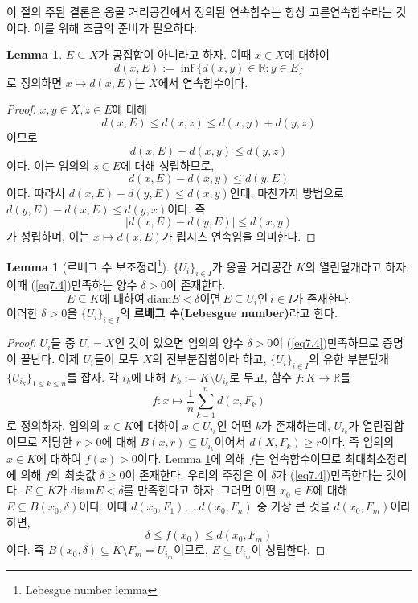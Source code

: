 \documentclass[11pt]{book}
\numberwithin{equation}{chapter}
\def\RR{\mathbb{R}}
\newcommand{\abs}[1]{\left\vert#1\right\vert}
\def\diam{\text{diam}}
\theoremstyle{definition}
\newtheorem{lem}[thm]{Lemma}
\begin{document}
이 절의 주된 결론은 옹골 거리공간에서 정의된 연속함수는 항상 고른연속함수라는 것이다. 이를 위해 조금의 준비가 필요하다.

\begin{lem} \label{lem 7.4.2}
    \(E \subseteq X\)가 공집합이 아니라고 하자. 이때 \(x \in X\)에 대하여
    \[
    d(x, E) := \inf \{d(x, y) \in \RR : y \in E\}
    \]
    로 정의하면 \(x \mapsto d(x, E)\)는 \(X\)에서 연속함수이다.
\end{lem}
\begin{proof}
    \(x, y \in X, z \in E\)에 대해
    \[
        d(x, E) \le d(x, z) \le d(x, y) + d(y, z)
    \]
    이므로
    \[
    d(x, E) - d(x, y) \le d(y, z)    
    \]
    이다. 이는 임의의 \(z \in E\)에 대해 성립하므로,
    \[
    d(x, E) - d(x, y) \le d(y, E)
    \]
    이다. 따라서 \(d(x, E) - d(y, E) \le d(x, y)\)인데, 마찬가지 방법으로 \(d(y, E) - d(x, E) \le d(y, x)\)이다. 즉
    \[
    \abs{d(x, E) - d(y, E)} \le d(x, y)    
    \]
    가 성립하며, 이는 \(x \mapsto d(x, E)\)가 립시츠 연속임을 의미한다.
\end{proof}

\begin{lem}[르베그 수 보조정리\footnote{Lebesgue number lemma}]
    \(\{U_i\}_{i \in I}\)가 옹골 거리공간 \(K\)의 열린덮개라고 하자. 이때 (\ref{eq7.4})\를 만족하는 양수 \(\delta > 0\)이 존재한다.
    \begin{equation} \label{eq7.4}
        E \subseteq K\text{에 대하여} \ \diam E < \delta \text{이면} \ E \subseteq U_i \text{인} \ i \in I \text{가 존재한다.}
    \end{equation}
    이러한 \(\delta > 0\)을 \(\{U_i\}_{i \in I}\)의 \textbf{르베그 수(Lebesgue number)}라고 한다.
\end{lem}
\begin{proof}
    \(U_i\)들 중 \(U_i = X\)인 것이 있으면 임의의 양수 \(\delta > 0\)이 (\ref{eq7.4})\를 만족하므로 증명이 끝난다. 이제 \(U_i\)들이 모두 \(X\)의 진부분집합이라 하고, \(\{U_i\}_{i \in I}\)의 유한 부분덮개 \(\{U_{i_k}\}_{1 \le k \le n}\)를 잡자. 각 \(i_k\)에 대해 \(F_k := K \setminus U_{i_k}\)로 두고, 함수 \(f : K \to \RR\)를
    \[
    f : x \mapsto \frac{1}{n}\sum_{k=1}^n d(x, F_{k})    
    \]
    로 정의하자. 임의의 \(x \in K\)에 대하여 \(x \in U_{i_k}\)인 어떤 \(k\)가 존재하는데, \(U_{i_k}\)가 열린집합이므로 적당한 \(r > 0\)에 대해 \(B(x, r) \subseteq U_{i_k}\)이어서 \(d(X, F_k) \ge r\)이다. 즉 임의의 \(x \in K\)에 대하여 \(f(x) > 0\)이다. Lemma \ref{lem 7.4.2}에 의해 \(f\)는 연속함수이므로 최대최소정리에 의해 \(f\)의 최솟값 \(\delta \ge 0\)이 존재한다. 우리의 주장은 이 \(\delta\)가 (\ref{eq7.4})\를 만족한다는 것이다. \(E \subseteq K\)가 \(\diam E < \delta\)를 만족한다고 하자. 그러면 어떤 \(x_0 \in E\)에 대해 \(E \subseteq B(x_0, \delta)\)이다. 이때 \(d(x_0, F_1), \ldots d(x_0, F_n)\) 중 가장 큰 것을 \(d(x_0, F_m)\)이라 하면,
    \[
    \delta \le f(x_0) \le d(x_0, F_m)
    \]
    이다. 즉 \(B(x_0, \delta) \subseteq K \setminus F_m = U_{i_m}\)이므로, \(E \subseteq U_{i_m}\)이 성립한다.
\end{proof}
\end{document}
